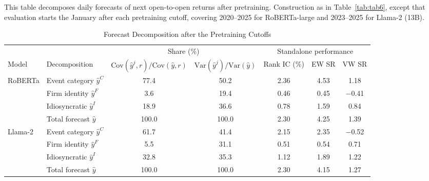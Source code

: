 \begin{table}[htbp]
\centering
\caption{Forecast Decomposition after the Pretraining Cutoffs}
\label{tab:tabC_post_split}
\begin{minipage}{\linewidth}\footnotesize
This table decomposes daily forecasts of next open-to-open returns after pretraining. Construction as in Table~\ref{tab:tab6}, except that evaluation starts the January after each pretraining cutoff, covering 2020--2025 for RoBERTa-large and 2023--2025 for Llama-2 (13B).
\end{minipage}
\medskip

{\footnotesize
\begin{adjustbox}{max width=\linewidth, max totalheight=0.75\textheight}
\begin{tabular}{llccccc}
\toprule
\multicolumn{2}{c}{} & \multicolumn{2}{c}{Share (\%)} & \multicolumn{3}{c}{Standalone performance} \\
\cmidrule(lr){3-4} \cmidrule(lr){5-7}
Model & Decomposition & $\mathrm{Cov}(\hat y^j,r)/\mathrm{Cov}(\hat y,r)$ & $\mathrm{Var}(\hat y^j)/\mathrm{Var}(\hat y)$ & Rank IC (\%) & EW SR & VW SR \\
\midrule
RoBERTa & Event category $\hat y^C$ & \phantom{0}77.4 & \phantom{0}50.2 & 2.36 & 4.53 & \phantom{$-$}1.18 \\
 & Firm identity $\hat y^F$ & \phantom{00}3.6 & \phantom{0}19.4 & 0.46 & 0.45 & $-$0.41 \\
 & Idiosyncratic $\hat y^I$ & \phantom{0}18.9 & \phantom{0}36.6 & 0.78 & 1.59 & \phantom{$-$}0.84 \\
 & Total forecast $\hat y$ & 100.0 & 100.0 & 2.30 & 4.25 & \phantom{$-$}1.39 \\
\midrule
Llama-2 & Event category $\hat y^C$ & \phantom{0}61.7 & \phantom{0}41.4 & 2.15 & 2.35 & $-$0.52 \\
 & Firm identity $\hat y^F$ & \phantom{00}5.5 & \phantom{0}31.1 & 0.51 & 0.54 & \phantom{$-$}0.71 \\
 & Idiosyncratic $\hat y^I$ & \phantom{0}32.8 & \phantom{0}35.3 & 1.12 & 1.89 & \phantom{$-$}1.22 \\
 & Total forecast $\hat y$ & 100.0 & 100.0 & 2.30 & 4.15 & \phantom{$-$}1.27 \\
\bottomrule
\end{tabular}
\end{adjustbox}
}
\end{table}
